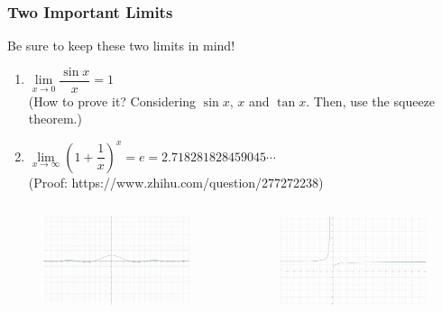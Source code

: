 \begin{frame}
	\frametitle{Two Important Limits}
	Be sure to keep these two limits in mind!
	\begin{enumerate}
		\item $\lim\limits_{\textit{x} \to 0}\dfrac{\sin{x}}{x} = 1$\\
		      (How to prove it? Considering $\sin{x}$, $x$ and $\tan{x}$. Then, use the squeeze theorem.)
		\item $\lim\limits_{\textit{x} \to \infty}(1 + \dfrac{1}{x})^{x} = e = 2.718281828459045\cdots$ \\
		      (Proof: https://www.zhihu.com/question/277272238)
		
	\end{enumerate}
	\begin{columns}[c] %
		\begin{column}{0.5\textwidth} %
			\begin{figure}
				\includegraphics[width=1\linewidth]{res/bbb.jpg}
			\end{figure}
		\end{column}
		\begin{column}{0.5\textwidth} %
			\begin{figure}
				\includegraphics[width=1\linewidth]{res/aaa.jpg}
			\end{figure}
		\end{column}
	\end{columns}
\end{frame}

